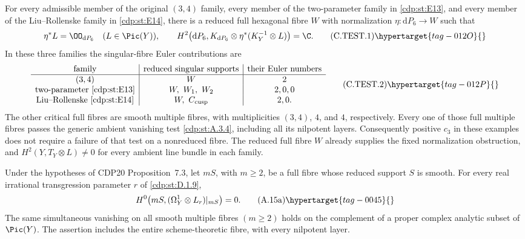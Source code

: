 
\begin{proposition}\hypertarget{tag-01FQ}{}\label{cdp:st:C4g}


For every admissible member of the original $(3,4)$ family,
every member of the two-parameter family in \ref{cdp:st:E13}, and every
member of the Liu--Rollenske family in \ref{cdp:st:E14}, there is a reduced
full hexagonal fibre $W$ with normalization
$\eta:\mathrm dP_6\to W$ such that
\[
 \eta^*L=\OO_{\mathrm dP_6}\quad(L\in\Pic(Y)),\qquad
 H^2\bigl(\mathrm dP_6,K_{\mathrm dP_6}\otimes
                    \eta^*(K_Y^{-1}\otimes L)\bigr)=\C.
 \tag{C.TEST.1}\hypertarget{tag-012O}{}\label{cdp:eq:C.TEST.1}
\]
In these three families the singular-fibre Euler contributions are
\[
\begin{array}{c|c|c}
\text{family}&\text{reduced singular supports}&
                 \text{their Euler numbers}\\ \hline
(3,4)&W&2\\
\text{two-parameter \ref{cdp:st:E13}}&W,\ W_1,\ W_2&2,0,0\\
\text{Liu--Rollenske \ref{cdp:st:E14}}&W,\ C_{\rm cusp}&2,0 .
\end{array}
\tag{C.TEST.2}\hypertarget{tag-012P}{}\label{cdp:eq:C.TEST.2}
\]
The other critical full fibres are smooth multiple fibres,
with multiplicities $(3,4)$, $4$, and $4$, respectively.
Every one of those full multiple fibres passes the generic
ambient vanishing test \ref{cdp:st:A.3.4}, including all its nilpotent
layers. Consequently positive $c_3$ in these examples does
not require a failure of that test on a nonreduced fibre.
The reduced full fibre $W$ already supplies the fixed
normalization obstruction, and $H^2(Y,T_Y\otimes L)\ne0$
for every ambient line bundle in each family.
\end{proposition}

\begin{proposition}\hypertarget{tag-01AO}{}\label{cdp:st:A.3.4}


Under the hypotheses of CDP20 Proposition~7.3, let $mS$, with $m\ge2$, be a full fibre whose reduced support $S$ is smooth. For every real irrational transgression parameter $r$ of \ref{cdp:st:D.1.9},
\[
 H^0\bigl(mS,(\Omega_Y^1\otimes L_r)|_{mS}\bigr)=0.
 \tag{A.15a}\hypertarget{tag-0045}{}\label{cdp:eq:A.15a}
\]
The same simultaneous vanishing on all smooth multiple fibres $(m\ge2)$ holds on the complement of a proper complex analytic subset of $\Pic(Y)$. The assertion includes the entire scheme-theoretic fibre, with every nilpotent layer.
\end{proposition}

